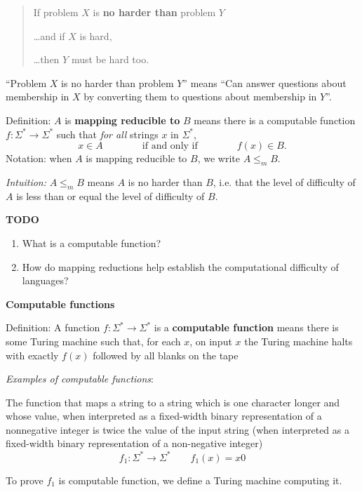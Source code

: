 \documentclass[12pt, oneside]{article}
\begin{document}
\begin{quote}
    If problem $X$ is {\bf no harder than} problem $Y$
    
    \ldots and if $X$ is hard,
    
    \ldots then $Y$ must be hard too.
\end{quote}

``Problem $X$ is no harder than problem $Y$'' means 
``Can answer questions about membership in $X$ by converting them to questions about membership in $Y$''.



Definition:  $A$ is  {\bf  mapping  reducible to} $B$  means there is a computable function 
$f : \Sigma^* \to \Sigma^*$ such that {\it for all} strings  $x$ in $\Sigma^*$, 
\[
x  \in  A \qquad \qquad \text{if and  only  if} \qquad \qquad f(x) \in B.
\]
Notation:  when $A$  is mapping reducible to $B$, we write $A  \leq_m B$.

{\it Intuition:} $A \leq_m B$ means $A$ is no harder than $B$, i.e. that the level 
of difficulty of $A$ is less than or equal the level of difficulty of $B$.

\vfill

{\bf TODO} 
\begin{enumerate}
\item What is a computable function?
\item How do mapping reductions help establish the computational difficulty of languages?
\end{enumerate}

\newpage
{\bf Computable functions}

Definition: A function $f: \Sigma^* \to \Sigma^*$ is a {\bf computable function} means there is some Turing machine such that, 
for each $x$, on input $x$ the Turing machine halts with exactly $f(x)$ followed by all blanks on the tape

\vspace{50pt}


{\it Examples of computable functions}:

The function that maps a string to a string which is one character longer and 
whose value, when interpreted as a fixed-width binary representation of a
nonnegative integer is twice the value of the input string (when interpreted as 
a fixed-width binary representation of a non-negative integer)
\[
f_1: \Sigma^* \to \Sigma^* \qquad  f_1(x)  = x0
\]

To prove $f_1$ is computable function, we define a Turing machine computing it.
\end{document}

